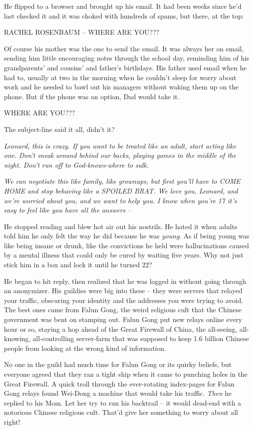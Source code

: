 He flipped to a browser and brought up his email. It had been weeks
since he'd last checked it and it was choked with hundreds of
spams, but there, at the top:

RACHEL ROSENBAUM -- WHERE ARE YOU???

Of course his mother was the one to send the email. It was always
her on email, sending him little encouraging notes through the
school day, reminding him of his grandparents' and cousins' and
father's birthdays. His father used email when he had to, usually
at two in the morning when he couldn't sleep for worry about work
and he needed to bawl out his managers without waking them up on
the phone. But if the phone was an option, Dad would take it.

WHERE ARE YOU???

The subject-line said it all, didn't it?

\emph{Leonard, this is crazy. If you want to be treated like an adult, start acting like one. Don't sneak around behind our backs, playing games in the middle of the night. Don't run off to God-knows-where to sulk.}

\emph{We can negotiate this like family, like grownups, but first you'll have to COME HOME and stop behaving like a SPOILED BRAT. We love you, Leonard, and we're worried about you, and we want to help you. I know when you're 17 it's easy to feel like you have all the answers --}

He stopped reading and blew hot air out his nostrils. He hated it
when adults told him he only felt the way he did because he was
\emph{young}. As if being young was like being insane or drunk,
like the convictions he held were hallucinations caused by a mental
illness that could only be cured by waiting five years. Why not
just stick him in a box and lock it until he turned 22?

He began to hit reply, then realized that he was logged in without
going through an anonymizer. His guildies were big into these --
they were servers that relayed your traffic, obscuring your
identity and the addresses you were trying to avoid. The best ones
came from Falun Gong, the weird religious cult that the Chinese
government was bent on stamping out. Falun Gong put new relays
online every hour or so, staying a hop ahead of the Great Firewall
of China, the all-seeing, all-knowing, all-controlling server-farm
that was supposed to keep 1.6 billion Chinese people from looking
at the wrong kind of information.

No one in the guild had much time for Falun Gong or its quirky
beliefs, but everyone agreed that they ran a tight ship when it
came to punching holes in the Great Firewall. A quick troll through
the ever-rotating index-pages for Falun Gong relays found Wei-Dong
a machine that would take his traffic. \emph{Then} he replied to
his Mom. Let her try to run his backtrail -- it would dead-end with
a notorious Chinese religious cult. That'd give her something to
worry about all right!

